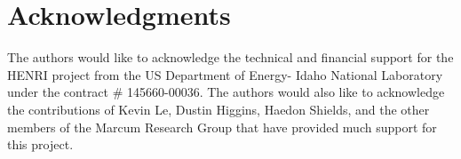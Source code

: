 \section*{Acknowledgments}

The authors would like to acknowledge the technical and financial support for the HENRI project from the US Department of Energy- Idaho National Laboratory under the contract \# 145660-00036. The authors would also like to acknowledge the contributions of Kevin Le, Dustin Higgins, Haedon Shields, and the other members of the Marcum Research Group that have provided much support for this project.